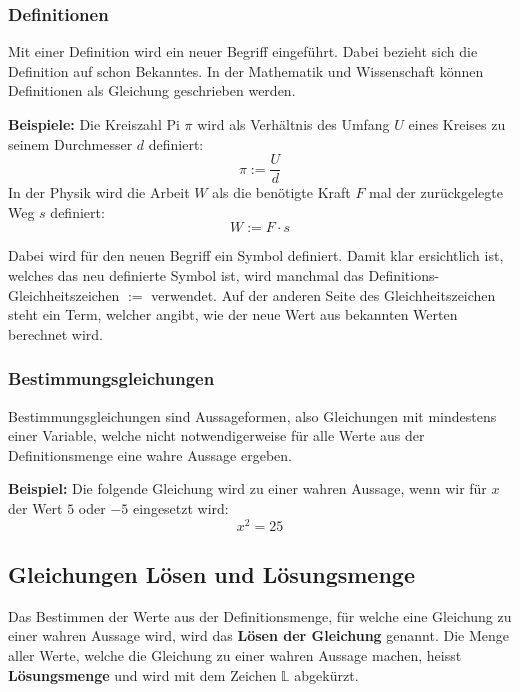 \subsubsection{Definitionen}

Mit einer Definition wird ein neuer Begriff eingeführt. Dabei bezieht sich die Definition auf schon Bekanntes. In der Mathematik und Wissenschaft können Definitionen als Gleichung geschrieben werden.
\begin{example}
  \textbf{Beispiele:} Die Kreiszahl Pi $\pi$ wird als Verhältnis des Umfang $U$ eines Kreises zu seinem Durchmesser $d$ definiert:
  \[
    \pi := \frac{U}{d}
  \]
  In der Physik wird die Arbeit $W$ als die benötigte Kraft $F$ mal der zurückgelegte Weg $s$ definiert:
  \[
    W := F\cdot s
  \]
\end{example}
Dabei wird für den neuen Begriff ein Symbol definiert. Damit klar ersichtlich ist, welches das neu definierte Symbol ist, wird manchmal das Definitions-Gleichheitszeichen $:=$ verwendet. Auf der anderen Seite des Gleichheitszeichen steht ein Term, welcher angibt, wie der neue Wert aus bekannten Werten berechnet wird.

\newpage
\subsubsection{Bestimmungsgleichungen}

Bestimmungsgleichungen sind Aussageformen, also Gleichungen mit mindestens einer Variable, welche nicht notwendigerweise für alle Werte aus der Definitionsmenge eine wahre Aussage ergeben.
\begin{example}
  \textbf{Beispiel:} Die folgende Gleichung wird zu einer wahren Aussage, wenn wir für $x$ der Wert $5$ oder $-5$ eingesetzt wird:
  \[
    x^2 = 25
  \]
\end{example}

\subsection{Gleichungen Lösen und Lösungsmenge}

Das Bestimmen der Werte aus der Definitionsmenge, für welche eine Gleichung zu einer wahren Aussage wird, wird das \textbf{Lösen der Gleichung} genannt. Die Menge aller Werte, welche die Gleichung zu einer wahren Aussage machen, heisst \textbf{Lösungsmenge} und wird mit dem Zeichen $\mathbb{L}$ abgekürzt.

